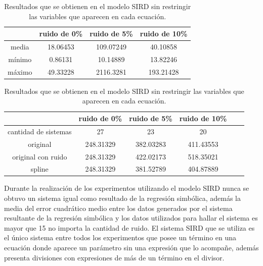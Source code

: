 \begin{table}[!h]
    \centering
    \caption{Resultados que se obtienen en el modelo SIRD sin restringir las variables que aparecen en cada ecuación.}
    \begin{tabular}{|c|c|c|c|}
        \hline
               & \textbf{ruido de 0\%} & \textbf{ruido de 5\%} & \textbf{ruido de 10\%} \\
        \hline
        media  & 18.06453              & 109.07249             & 40.10858               \\
        \hline
        mínimo & 0.86131               & 10.14889              & 13.82246               \\
        \hline
        máximo & 49.33228              & 2116.3281             & 193.21428              \\
        \hline
    \end{tabular}

    \begin{tabular}{|c|c|c|c|c|c|}
        \hline
                             & \textbf{ruido de 0\%} & \textbf{ruido de 5\%} & \textbf{ruido de 10\%} \\
        \hline
        cantidad de sistemas & 27                    & 23                    & 20                     \\
        \hline
        original             & 248.31329             & 382.03283             & 411.43553              \\
        \hline
        original con ruido   & 248.31329             & 422.02173             & 518.35021              \\
        \hline
        spline               & 248.31329             & 381.52789             & 404.87889              \\
        \hline
    \end{tabular}
    \label{table:experiment_SIRD_all}
\end{table}

Durante la realización de los experimentos utilizando el modelo SIRD nunca se obtuvo un sistema igual como resultado de la regresión simbólica, además la media del error cuadrático medio entre los datos generados por el sistema resultante de la regresión simbólica y los datos utilizados para hallar el sistema es mayor que 15 no importa la cantidad de ruido. El sistema SIRD que se utiliza es el único sistema entre todos los experimentos que posee un término en una ecuación donde aparece un parámetro sin una expresión que lo acompañe, además presenta divisiones con expresiones de más de un término en el divisor.


